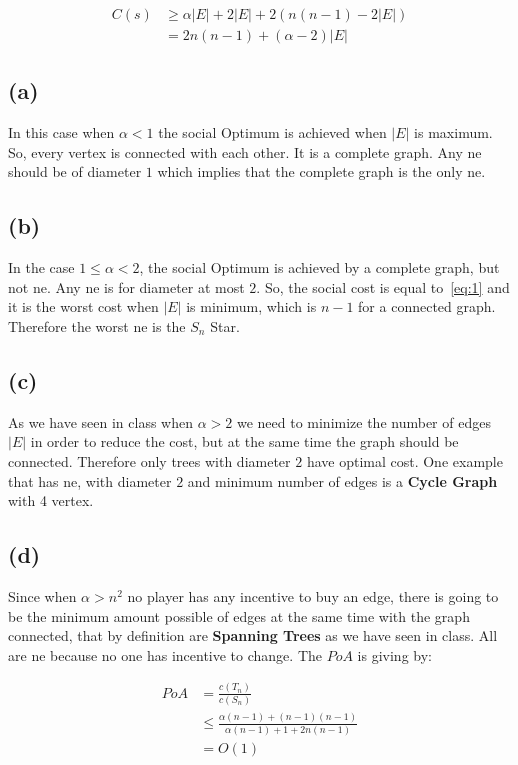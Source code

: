 \documentclass[12pt, a4paper]{article}
\begin{document}
\begin{subequations}
  \begin{align}
    C(s) &\geq \alpha|E| + 2|E| + 2(n(n - 1) - 2|E|)\\
         &= 2n(n - 1) + (\alpha - 2)|E|\label{eq:1}
  \end{align}
\end{subequations}

\subsection{(a)}
In this case when $\alpha < 1$ the social Optimum is achieved when $|E|$ is maximum. So, every vertex is connected with each other. It is a complete graph.
Any \acrfull{ne} should be of diameter $1$ which implies that the complete graph is the only \acrshort{ne}.

\subsection{(b)}
In the case $1 \leq \alpha < 2$, the social Optimum is achieved by a complete graph, but not \acrshort{ne}. Any \acrshort{ne} is for diameter at most $2$.
So, the social cost is equal to~\ref{eq:1} and it is the worst cost when $|E|$ is minimum, which is $n-1$ for a connected graph. Therefore the worst \acrshort{ne} is the $S_n$ Star.

\subsection{(c)}
As we have seen in class when $\alpha > 2$ we need to minimize the number of edges $|E|$ in order to reduce the cost, but at the same time the graph should be connected.
Therefore only trees with diameter $2$ have optimal cost. One example that has \acrshort{ne}, with diameter $2$ and minimum number of edges is a \textbf{Cycle Graph} with 4 vertex.

\subsection{(d)}
Since when $\alpha > n^2$ no player has any incentive to buy an edge, there is going to be the minimum amount possible of edges at the same time with the graph connected, 
that by definition are \textbf{Spanning Trees} as we have seen in class. All are \acrshort{ne} because no one has incentive to change.
The $PoA$ is giving by:

\begin{subequations}
  \begin{align}
    PoA &= \frac{c(T_n)}{c(S_n)}\\
        &\leq \frac{\alpha(n-1)+(n-1)(n-1)}{\alpha(n-1)+1+2n(n-1)}\\ 
        & = O(1)
  \end{align}
\end{subequations}
\end{document}
